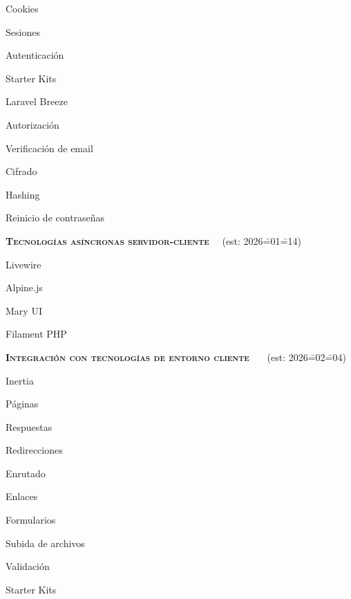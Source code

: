 \begin{longenum}
    \begin{longenum}
        \item Cookies
        \item Sesiones
        \item Autenticación
        \begin{longenum}
            \item Starter Kits
            \item Laravel Breeze
        \end{longenum}
        \item Autorización
        \item Verificación de email
        \item Cifrado
        \item Hashing
        \item Reinicio de contraseñas
    \end{longenum}
    \item \textbf{\textsc{Tecnologías asíncronas servidor-cliente}} \ \ (est: 2026\==01\==14)
    \begin{longenum}
        \item Livewire
        \begin{longenum}
            \item Alpine.js
            \item Mary UI
        \end{longenum}
        \item Filament PHP
    \end{longenum}
    \item \textbf{\textsc{Integración con tecnologías de entorno cliente}} \dual\ \ \ (est: 2026\==02\==04)
    \begin{longenum}
        \item Inertia
        \begin{longenum}
            \item Páginas
            \item Respuestas
            \item Redirecciones
            \item Enrutado
            \item Enlaces
            \item Formularios
            \item Subida de archivos
            \item Validación
        \end{longenum}
        \item Starter Kits

\end{longenum}
\end{longenum}
